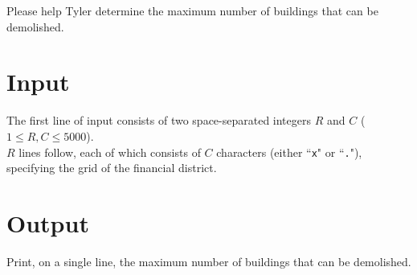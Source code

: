 Please help Tyler determine the maximum number of buildings that can be demolished.

\section*{Input}
The first line of input consists of two space-separated integers $R$ and $C$ ($1 \le R, C \le 5000$).\\
$R$ lines follow, each of which consists of $C$ characters (either ``\texttt{x}" or ``\texttt{.}"), specifying the grid of the financial district.

\section*{Output}
Print, on a single line, the maximum number of buildings that can be demolished.
